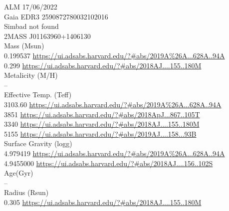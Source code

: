 ALM 17/06/2022\\
Gaia EDR3 2590872780032102016\\
Simbad not found\\
2MASS J01163960+1406130\\
Mass (Msun)\\
0.199537 \url{https://ui.adsabs.harvard.edu/?#abs/2019A%26A...628A..94A}\\
0.299 \url{https://ui.adsabs.harvard.edu/?#abs/2018AJ....155..180M}\\
Metalicity (M/H)\\
--\\
Effective Temp. (Teff)\\
3103.60 \url{https://ui.adsabs.harvard.edu/?#abs/2019A%26A...628A..94A}\\
3851 \url{https://ui.adsabs.harvard.edu/?#abs/2018ApJ...867..105T}\\
3340 \url{https://ui.adsabs.harvard.edu/?#abs/2018AJ....155..180M}\\
5155 \url{https://ui.adsabs.harvard.edu/?#abs/2019AJ....158...93B}\\
Surface Gravity (logg)\\
4.979419 \url{https://ui.adsabs.harvard.edu/?#abs/2019A%26A...628A..94A}\\
4.9455000 \url{https://ui.adsabs.harvard.edu/?#abs/2018AJ....156..102S}\\
Age(Gyr)\\
--\\
Radius (Rsun)\\
0.305 \url{https://ui.adsabs.harvard.edu/?#abs/2018AJ....155..180M}\\

